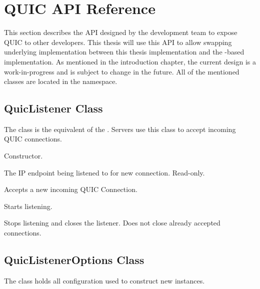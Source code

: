 \section{QUIC API Reference}\label{sec:06-api}

This section describes the API designed by the \dotnet{} development team to expose QUIC to other
developers. This thesis will use this API to allow swapping underlying implementation between this
thesis implementation and the \libmsquic{}-based implementation. As mentioned in the introduction
chapter, the current design is a work-in-progress and is subject to change in the future. All of the
mentioned classes are located in the  namespace.

\subsection{QuicListener Class}

The  class is the equivalent of the . Servers use this class
to accept incoming QUIC connections.

\begin{description}

     Constructor.

     The IP endpoint being listened to for new
connection. Read-only.

Accepts a new incoming QUIC Connection.

     Starts listening.

     Stops listening and closes the listener. Does not close
already accepted connections.

\end{description}

\subsection{QuicListenerOptions Class}

The  class holds all configuration used to construct new
 instances.

